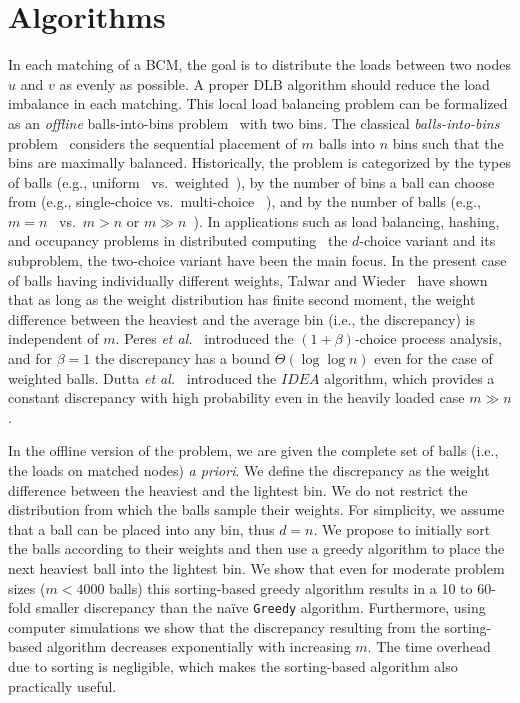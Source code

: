 \documentclass[12pt,psfig,a4]{article}
\newcommand{\gr}{\texttt{Greedy}}
\theoremstyle{plain}
\begin{document}
\section{Algorithms}
\label{sec:alg}
In each matching of a BCM, the goal is to distribute the loads between two nodes $u$ and $v$ as evenly as possible. A proper DLB algorithm should reduce the load imbalance in each matching. This local load balancing problem can be formalized as an \textit{offline} balls-into-bins problem~\cite{raab1998balls,berenbrink2006balanced} with two bins. The classical \textit{balls-into-bins} problem~\cite{johnson1977urn,kolchin1978random} considers the sequential placement of $m$ balls into $n$ bins such that the bins are maximally balanced. Historically, the problem is categorized by the types of balls (e.g., uniform~\cite{azar1994balanced,azar1999balanced} vs.~weighted~\cite{berenbrink2008weighted,talwar2007balanced,peres20101+,dutta2011perfectly}), by the number of bins a ball can choose from (e.g., single-choice vs.~multi-choice~ \cite{mitzenmacher2001power}), and by the number of balls (e.g., $m=n$~\cite{raab1998balls} vs.~$m>n$ or $m\gg n$~\cite{berenbrink2006balanced}). In applications such as load balancing, hashing, and occupancy problems in distributed computing~\cite{berenbrink2008weighted,berenbrink2006balanced,czumaj2003perfectly} the $d$-choice variant and its subproblem, the two-choice variant have been the main focus. In the present case of balls having individually different weights, Talwar and Wieder~\cite{talwar2007balanced} have shown that as long as the weight distribution has finite second moment, the weight difference between the heaviest and the average bin (i.e., the discrepancy) is independent of $m$. Peres \textit{et al.}~\cite{peres20101+} introduced the $(1+\beta)$-choice process analysis, and for $\beta=1$ the discrepancy has a bound $\Theta(\log \log n)$ even for the case of weighted balls. Dutta \textit{et al.}~\cite{dutta2011perfectly} introduced the $IDEA$ algorithm, which provides a constant discrepancy with high probability even in the heavily loaded case $m\gg n$. 
 
In the offline version of the problem, we are given the complete set of balls (i.e., the loads on matched nodes) \textit{a priori}. We define the discrepancy as the weight difference between the heaviest and the lightest bin. We do not restrict the distribution from which the balls sample their weights. For simplicity, we assume that a ball can be placed into any bin, thus $d=n$. We propose to initially sort the balls according to their weights and then use a greedy algorithm to place the next heaviest ball into the lightest bin. We show that even for moderate problem sizes ($m<4000$ balls) this sorting-based greedy algorithm results in a 10 to 60-fold smaller discrepancy than the na\"{i}ve \gr{} algorithm. Furthermore, using computer simulations we show that the discrepancy resulting from the sorting-based algorithm decreases exponentially with increasing $m$. The time overhead due to sorting is negligible, which makes the sorting-based algorithm also practically useful. 
\end{document}

